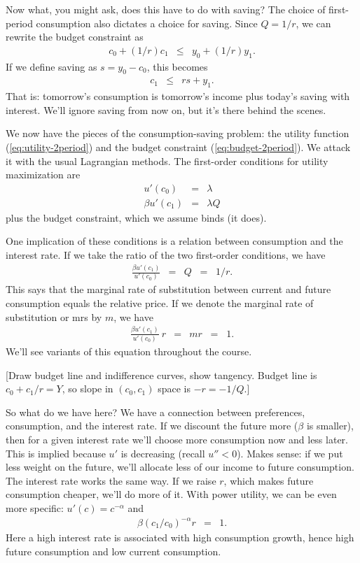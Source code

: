 \documentclass[11pt]{article}
\begin{document}
Now what, you might ask, does this have to do with saving?
The choice of first-period consumption also dictates a choice for saving.
Since $Q = 1/r$, we can rewrite the budget constraint as
\begin{eqnarray*}
    c_0 + (1/r) c_1 &\leq& y_0 + (1/r) y_1 .
\end{eqnarray*}
If we define saving as $s = y_0 - c_0$,
this becomes
\begin{eqnarray*}
    c_1  &\leq& r s +  y_1 .
\end{eqnarray*}
That is:  tomorrow's consumption is tomorrow's income
plus today's saving with interest.
We'll ignore saving from now on, but it's there behind the scenes.

We now have the pieces of the consumption-saving problem:
the utility function (\ref{eq:utility-2period})
and the budget constraint (\ref{eq:budget-2period}).
We attack it with the usual Lagrangian methods.
The first-order conditions for utility maximization are
\begin{eqnarray*}
        u'(c_0)  &=& \lambda  \\
       \beta u'(c_1)  &=& \lambda Q
\end{eqnarray*}
plus the budget constraint, which we assume binds (it does).

One implication of these conditions is a relation
between consumption and the interest rate.
If we take the ratio of the two first-order conditions,
we have
\begin{eqnarray*}
       \frac {\beta u'(c_1)}{u'(c_0)}  &=& Q \;\;=\;\; 1/r.
\end{eqnarray*}
This says that the marginal rate of substitution
between current and future consumption equals
the relative price.
If we denote the marginal rate of substitution or mrs by $m$, we have
\begin{eqnarray}
       \frac{\beta u'(c_1)}{u'(c_0)} \ r  &=& m r \;\;=\;\;  1 .
       \label{eq:euler-deterministic}
\end{eqnarray}
We'll see variants of this equation throughout the course.

[Draw budget line and indifference curves, show tangency.
Budget line is $c_0 + c_1/r = Y$, so slope in $(c_0,c_1)$ space
is $-r = - 1/Q$.]

So what do we have here?  We have a connection between
preferences, consumption, and the interest rate.
If we discount the future more ($\beta$ is smaller),
then for a given interest rate we'll choose
more consumption now and less later.
This is implied because $u'$ is decreasing (recall $u''<0$).
Makes sense:  if we put less weight on the future,
we'll allocate less of our income to future consumption.
The interest rate works the same way.
If we raise $r$, which makes future consumption cheaper,
we'll do more of it.
With power utility, we can be even more specific:
$u'(c) = c^{-\alpha}$ and
\begin{eqnarray*}
       \beta (c_1/c_0)^{-\alpha}  r  &=& 1 .
\end{eqnarray*}
Here a high interest rate is associated with
high consumption growth,
hence high future consumption and low current consumption.
\end{document}
